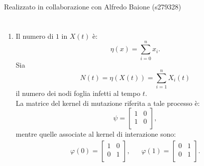 \documentclass[11pt,largemargins]{homework}
\begin{document}
\maketitle
\begin{center}
Realizzato in collaborazione con Alfredo Baione (s279328)
\end{center}
\section{}%
  
    
    
  \begin{enumerate}
 
  
    \item
     Il numero di $1$ in $X(t)$ è:
     \begin{equation*}
     \eta\left(x\right)= \sum_{i=0}^{n}x_{i}.
     \end{equation*}
    Sia 
    \begin{equation*}
    N\left(t\right)=\eta\left(X\left(t\right)\right)=\sum_{i=1}^{n}X_{i}\left(t\right)
    \end{equation*}
     il numero dei nodi foglia infetti al tempo $t$.\\
     La matrice del kernel di mutazione riferita a tale processo è:
    \begin{equation*}
      \psi=
      \begin{bmatrix}
        1 & 0  \\
        1 & 0  \\
      \end{bmatrix},
      \end{equation*}
  mentre quelle associate al kernel di interazione sono:
   \begin{align*}
      \varphi\left(0\right)=\begin{bmatrix}
        1 & 0\\
        0 & 1 \\ 
      \end{bmatrix}, &&  
      \varphi\left(1\right)=\begin{bmatrix}
         0 & 1\\
        0 & 1 \\ 
      \end{bmatrix}.
    \end{align*}
    

\end{enumerate}
\end{document}
